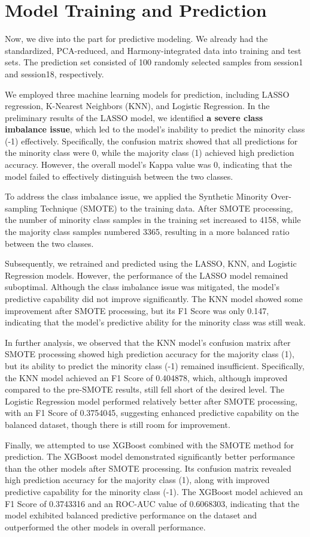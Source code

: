 \documentclass{article}
\begin{document}
	\section{Model Training and Prediction}
	\par Now, we dive into the part for predictive modeling. We already had the standardized, PCA-reduced, and Harmony-integrated data into training and test sets. The prediction set consisted of 100 randomly selected samples from session1 and session18, respectively. 
	\par We employed three machine learning models for prediction, including LASSO regression, K-Nearest Neighbors (KNN), and Logistic Regression. In the preliminary results of the LASSO model, we identified \textbf{a severe class imbalance issue}, which led to the model's inability to predict the minority class (-1) effectively. Specifically, the confusion matrix showed that all predictions for the minority class were 0, while the majority class (1) achieved high prediction accuracy. However, the overall model's Kappa value was 0, indicating that the model failed to effectively distinguish between the two classes.
	\par To address the class imbalance issue, we applied the Synthetic Minority Over-sampling Technique (SMOTE) to the training data. After SMOTE processing, the number of minority class samples in the training set increased to 4158, while the majority class samples numbered 3365, resulting in a more balanced ratio between the two classes. 
	\par Subsequently, we retrained and predicted using the LASSO, KNN, and Logistic Regression models. However, the performance of the LASSO model remained suboptimal. Although the class imbalance issue was mitigated, the model's predictive capability did not improve significantly. The KNN model showed some improvement after SMOTE processing, but its F1 Score was only 0.147, indicating that the model's predictive ability for the minority class was still weak.
	\par In further analysis, we observed that the KNN model's confusion matrix after SMOTE processing showed high prediction accuracy for the majority class (1), but its ability to predict the minority class (-1) remained insufficient. Specifically, the KNN model achieved an F1 Score of 0.404878, which, although improved compared to the pre-SMOTE results, still fell short of the desired level. The Logistic Regression model performed relatively better after SMOTE processing, with an F1 Score of 0.3754045, suggesting enhanced predictive capability on the balanced dataset, though there is still room for improvement.
	\par Finally, we attempted to use XGBoost combined with the SMOTE method for prediction. The XGBoost model demonstrated significantly better performance than the other models after SMOTE processing. Its confusion matrix revealed high prediction accuracy for the majority class (1), along with improved predictive capability for the minority class (-1). The XGBoost model achieved an F1 Score of 0.3743316 and an ROC-AUC value of 0.6068303, indicating that the model exhibited balanced predictive performance on the dataset and outperformed the other models in overall performance.
	\clearpage
\end{document}
